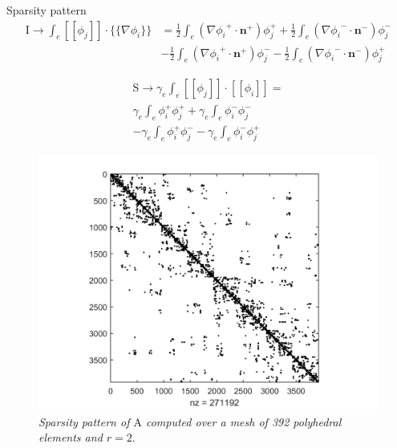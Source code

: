 \documentclass{beamer}
\begin{document}
\begin{frame}{Sparsity pattern}
	\vspace*{-12pt}
	\begin{align*}
	\mathrm{I} \rightarrow \int_e [\![\phi_j]\!] \cdot \{\!\!\{ \nabla \phi_i
	\}\!\!\} &=
	\frac{1}{2} \int_e (\nabla{\phi_i}^+ \cdot \mathbf{n}^+ )\phi_j^+
	+ \frac{1}{2} \int_e (\nabla{\phi_i}^- \cdot \mathbf{n}^- )\phi_j^-\\
	&- \frac{1}{2} \int_e (\nabla{\phi_i}^+ \cdot \mathbf{n}^+ )\phi_j^-
	- \frac{1}{2} \int_e (\nabla{\phi_i}^- \cdot \mathbf{n}^- )\phi_j^+
	\end{align*}
	\vspace*{-1cm}
	\begin{minipage}[t]{0.55\textwidth}
		\begin{multline*}
			\mathrm{S} \rightarrow \gamma_e \int_e [\![\phi_j]\!] \cdot
			[\![\phi_i]\!] =\\
			\gamma_e \int_e \phi_i^+ \phi_j^+
			+ \gamma_e \int_e \phi_i^- \phi_j^-\\
			- \gamma_e \int_e \phi_i^+ \phi_j^-
			- \gamma_e \int_e \phi_i^- \phi_j^+
		\end{multline*}
	\end{minipage}%
	\begin{minipage}[t]{0.45\textwidth}
	\begin{figure}
		\centering
		\includegraphics[scale=0.35]{spy_A}\\
		\tiny
		\textit{Sparsity pattern of $\mathrm{A}$ computed over a mesh
		of 392 polyhedral elements and $r=2$}.
	\end{figure}
\end{minipage}
\end{frame}
\end{document}

